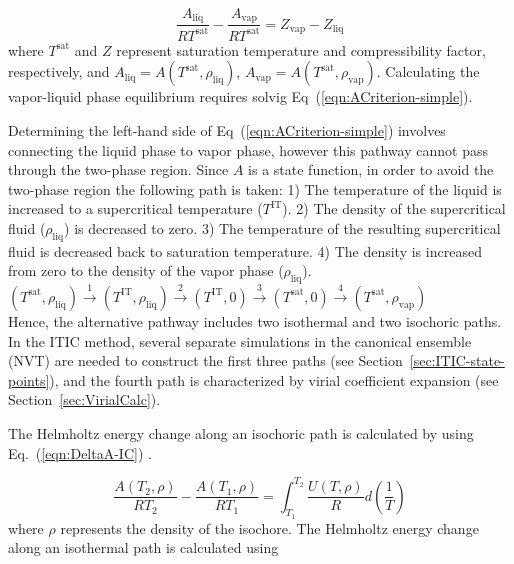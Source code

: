 \documentclass[5p,times]{elsarticle}
\begin{document}
\begin{equation}
\frac{A_\mathrm{liq}}{RT^\mathrm{sat}} - \frac{A_\mathrm{vap}}{RT^\mathrm{sat}} = Z_\mathrm{vap} - Z_\mathrm{liq} 
\label{eqn:ACriterion-simple}
\end{equation}
where $T^\mathrm{sat}$ and $Z$ represent saturation temperature and compressibility factor, respectively, and $A_\mathrm{liq}=A(T^\mathrm{sat},\rho_\mathrm{liq})$, $A_\mathrm{vap}=A(T^\mathrm{sat},\rho_\mathrm{vap})$. Calculating the vapor-liquid phase equilibrium requires solvig Eq~(\ref{eqn:ACriterion-simple}).

Determining the left-hand side of Eq~(\ref{eqn:ACriterion-simple}) involves connecting the liquid phase to vapor phase, however this pathway cannot pass through the two-phase region. Since $A$ is a state function, in order to avoid the two-phase region the following path is taken: 1) The temperature of the liquid is increased to a supercritical temperature ($T^\mathrm{IT}$). 2) The density of the supercritical fluid ($\rho_\mathrm{liq}$) is decreased to zero. 3) The temperature of the resulting supercritical fluid is decreased back to saturation temperature. 4) The density is increased from zero to the density of the vapor phase ($\rho_\mathrm{liq}$).\\

$(T^\mathrm{sat},\rho_\mathrm{liq}) \xrightarrow{\text{1}} (T^\mathrm{IT},\rho_\mathrm{liq}) \xrightarrow{\text{2}} (T^\mathrm{IT},0) \xrightarrow{\text{3}} (T^\mathrm{sat},0) \xrightarrow{\text{4}} (T^\mathrm{sat},\rho_\mathrm{vap})$ \\

Hence, the alternative pathway includes two isothermal and two isochoric paths. In the ITIC method, several separate simulations in the canonical ensemble (NVT) are needed to construct the first three paths (see Section~\ref{sec:ITIC-state-points}), and the fourth path is characterized by virial coefficient expansion (see Section~\ref{sec:VirialCalc}).

The Helmholtz energy change along an isochoric path is calculated by using Eq.~(\ref{eqn:DeltaA-IC}) \cite{Elliott1999}.

\begin{equation}
 \frac{A(T_2,\rho)}{RT_2} -  \frac{A(T_1,\rho)}{RT_1}  = \int _{T_1}^{T_2} \frac{U(T,\rho)}{R}  d\left(\frac{1}{T}\right)
\label{eqn:DeltaA-IC}
\end{equation}
where $\rho$ represents the density of the isochore. The Helmholtz energy change along an isothermal path is calculated using
\end{document}
